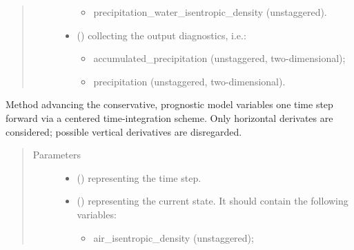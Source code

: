 \documentclass[letterpaper,10pt,english]{sphinxmanual}
\begin{document}
\begin{fulllineitems}
\begin{fulllineitems}
\begin{quote}
\begin{description}
\begin{itemize}
\begin{itemize}
\item {} 
precipitation\_water\_isentropic\_density (unstaggered).

\end{itemize}

\item {} 
 () \textendash{} {\hyperref[\detokenize{api:tasmania.storages.grid_data.GridData}]{}} collecting the output diagnostics, i.e.:
\begin{itemize}
\item {} 
accumulated\_precipitation (unstaggered, two-dimensional);

\item {} 
precipitation (unstaggered, two-dimensional).

\end{itemize}

\end{itemize}


\end{description}\end{quote}

\end{fulllineitems}


\begin{fulllineitems}
\label{\detokenize{api:tasmania.dycore.prognostic_isentropic_centered.PrognosticIsentropicCentered.step_neglecting_vertical_advection}}
Method advancing the conservative, prognostic model variables one time step forward via a
centered time-integration scheme. Only horizontal derivates are considered; possible vertical
derivatives are disregarded.
\begin{quote}\begin{description}
\item[{Parameters}] \leavevmode\begin{itemize}
\item {} 
 () \textendash{}  representing the time step.

\item {} 
 () \textendash{} 
{\hyperref[\detokenize{api:tasmania.storages.state_isentropic.StateIsentropic}]{}} representing the current state.
It should contain the following variables:
\begin{itemize}
\item {} 
air\_isentropic\_density (unstaggered);


\end{itemize}
\end{itemize}
\end{description}
\end{quote}
\end{fulllineitems}
\end{fulllineitems}
\end{document}
